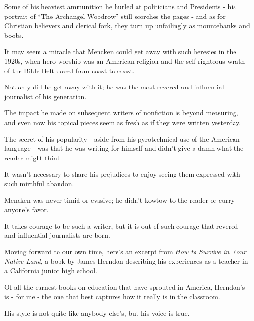 \documentclass{book}
\numberwithin{equation}{section}
\begin{document}
Some of his heaviest ammunition he hurled at politicians and Presidents - his portrait of ``The Archangel Woodrow'' still scorches the pages - and as for Christian believers and clerical fork, they turn up unfailingly as mountebanks and boobs.

%
It may seem a miracle that Mencken could get away with such heresies in the 1920s, when hero worship was an American religion and the self-righteous wrath of the Bible Belt oozed from coast to coast.

Not only did he get away with it; he was the most revered and influential journalist of his generation.

The impact he made on subsequent writers of nonfiction is beyond measuring, and even now his topical pieces seem as fresh as if they were written yesterday.

%
The secret of his popularity - aside from his pyrotechnical use of the American language - was that he was writing for himself and didn't give a damn what the reader might think.

It wasn't necessary to share his prejudices to enjoy seeing them expressed with such mirthful abandon.

Mencken was never timid or evasive; he didn't kowtow to the reader or curry anyone's favor.

It takes courage to be such a writer, but it is out of such courage that revered and influential journalists are born.

%
Moving forward to our own time, here's an excerpt from \textit{How to Survive in Your Native Land}, a book by James Herndon describing his experiences as a teacher in a California junior high school.

Of all the earnest books on education that have sprouted in America, Herndon's is - for me - the one that best captures how it really is in the classroom.

His style is not quite like anybody else's, but his voice is true.
\end{document}
